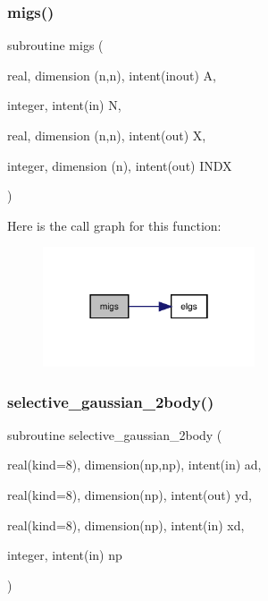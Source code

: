 \mbox{\label{bdf2__solver_8f90_a1d52c0b6e396cbbca4ef5cb6600a36bc}} 
\subsubsection{\texorpdfstring{migs()}{migs()}}
{\footnotesize\ttfamily subroutine migs (\begin{DoxyParamCaption}\item[{real, dimension (n,n), intent(inout)}]{A,  }\item[{integer, intent(in)}]{N,  }\item[{real, dimension (n,n), intent(out)}]{X,  }\item[{integer, dimension (n), intent(out)}]{I\+N\+DX }\end{DoxyParamCaption})}

Here is the call graph for this function\+:
\nopagebreak
\begin{figure}[H]
\begin{center}
\leavevmode
\includegraphics[width=178pt]{bdf2__solver_8f90_a1d52c0b6e396cbbca4ef5cb6600a36bc_cgraph}
\end{center}
\end{figure}
\mbox{\label{bdf2__solver_8f90_a8dbb8aa5a5523ba3d3eab9c0a85cd089}} 
\subsubsection{\texorpdfstring{selective\+\_\+gaussian\+\_\+2body()}{selective\_gaussian\_2body()}}
{\footnotesize\ttfamily subroutine selective\+\_\+gaussian\+\_\+2body (\begin{DoxyParamCaption}\item[{real(kind=8), dimension(np,np), intent(in)}]{ad,  }\item[{real(kind=8), dimension(np), intent(out)}]{yd,  }\item[{real(kind=8), dimension(np), intent(in)}]{xd,  }\item[{integer, intent(in)}]{np }\end{DoxyParamCaption})}

